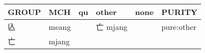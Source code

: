 \documentclass[14pt,a4paper]{scrartcl}
\begin{document}
\begin{longtable}[c]{@{}llllll@{}}
\toprule
\begin{minipage}[b]{0.14\columnwidth}\raggedright\strut
GROUP
\strut\end{minipage} &
\begin{minipage}[b]{0.14\columnwidth}\raggedright\strut
MCH
\strut\end{minipage} &
\begin{minipage}[b]{0.14\columnwidth}\raggedright\strut
qu
\strut\end{minipage} &
\begin{minipage}[b]{0.14\columnwidth}\raggedright\strut
other
\strut\end{minipage} &
\begin{minipage}[b]{0.14\columnwidth}\raggedright\strut
none
\strut\end{minipage} &
\begin{minipage}[b]{0.14\columnwidth}\raggedright\strut
PURITY
\strut\end{minipage}\tabularnewline
\midrule
\endhead
\begin{minipage}[t]{0.14\columnwidth}\raggedright\strut
兦
\strut\end{minipage} &
\begin{minipage}[t]{0.14\columnwidth}\raggedright\strut
meang
\strut\end{minipage} &
\begin{minipage}[t]{0.14\columnwidth}\raggedright\strut
\strut\end{minipage} &
\begin{minipage}[t]{0.14\columnwidth}\raggedright\strut
亡 mjang
\strut\end{minipage} &
\begin{minipage}[t]{0.14\columnwidth}\raggedright\strut
\strut\end{minipage} &
\begin{minipage}[t]{0.14\columnwidth}\raggedright\strut
pure:other
\strut\end{minipage}\tabularnewline
\begin{minipage}[t]{0.14\columnwidth}\raggedright\strut
亡
\strut\end{minipage} &
\begin{minipage}[t]{0.14\columnwidth}\raggedright\strut
mjang
\strut\end{minipage} &
\begin{minipage}[t]{0.14\columnwidth}\raggedright\strut
\strut\end{minipage} &
\begin{minipage}[t]{0.14\columnwidth}\raggedright\strut

\end{minipage}
\end{longtable}
\end{document}
